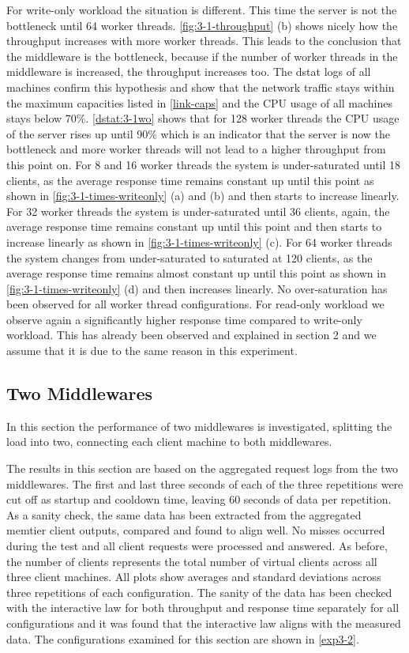 \documentclass[11pt,a4paper]{article}
\begin{document}
For write-only workload the situation is different. This time the server is not the bottleneck until 64 worker threads. \autoref{fig:3-1-throughput} (b) shows nicely how the throughput increases with more worker threads. This leads to the conclusion that the middleware is the bottleneck, because if the number of worker threads in the middleware is increased, the throughput increases too. The dstat logs of all machines confirm this hypothesis and show that the network traffic stays within the maximum capacities listed in \autoref{link-caps} and the CPU usage of all machines stays below 70\%.
\autoref{dstat:3-1wo} shows that for 128 worker threads the CPU usage of the server rises up until 90\% which is an indicator that the server is now the bottleneck and more worker threads will not lead to a higher throughput from this point on.
For 8 and 16 worker threads the system is under-saturated until 18 clients, as the average response time remains constant up until this point as shown in \autoref{fig:3-1-times-writeonly} (a) and (b) and then starts to increase linearly.
For 32 worker threads the system is under-saturated until 36 clients, again, the average response time remains constant up until this point and then starts to increase linearly as shown in \autoref{fig:3-1-times-writeonly} (c).
For 64 worker threads the system changes from under-saturated to saturated at 120 clients, as the average response time remains almost constant up until this point as shown in \autoref{fig:3-1-times-writeonly} (d) and then increases linearly.
No over-saturation has been observed for all worker thread configurations.
For read-only workload we observe again a significantly higher response time compared to write-only workload. This has already been observed and explained in section 2 and we assume that it is due to the same reason in this experiment.


\subsection{Two Middlewares} \label{sec3.2}

In this section the performance of two middlewares is investigated, splitting the load into two, connecting each client machine to both middlewares.

The results in this section are based on the aggregated request logs from the two middlewares. The first and last three seconds of each of the three repetitions were cut off as startup and cooldown time, leaving 60 seconds of data per repetition. As a sanity check, the same data has been extracted from the aggregated memtier client outputs, compared and found to align well. No misses occurred during the test and all client requests were processed and answered. As before, the number of clients represents the total number of virtual clients across all three client machines. All plots show averages and standard deviations across three repetitions of each configuration. The sanity of the data has been checked with the interactive law for both throughput and response time separately for all configurations and it was found that the interactive law aligns with the measured data. The configurations examined for this section are shown in \autoref{exp3-2}.
\end{document}
